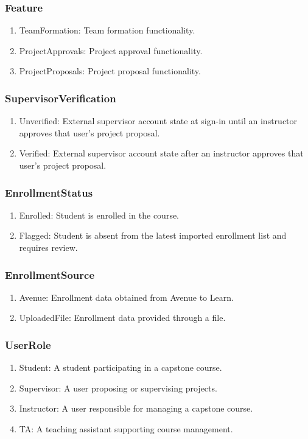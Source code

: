 \documentclass[12pt, titlepage]{article}
\begin{document}
\subsubsection{Feature}
\begin{enumerate}
    \item TeamFormation: Team formation functionality.
    \item ProjectApprovals: Project approval functionality.
    \item ProjectProposals: Project proposal functionality.
\end{enumerate}

\subsubsection{SupervisorVerification}
\begin{enumerate}
    \item Unverified: External supervisor account state at sign-in until an instructor approves that user's project proposal.
    \item Verified: External supervisor account state after an instructor approves that user's project proposal.
\end{enumerate}


\subsubsection{EnrollmentStatus}
\begin{enumerate}
    \item Enrolled: Student is enrolled in the course.
    \item Flagged: Student is absent from the latest imported enrollment list and requires review.
\end{enumerate}

\subsubsection{EnrollmentSource}
\begin{enumerate}
    \item Avenue: Enrollment data obtained from Avenue to Learn.
    \item UploadedFile: Enrollment data provided through a file.
\end{enumerate}

\subsubsection{UserRole}
\begin{enumerate}
    \item Student: A student participating in a capstone course.
    \item Supervisor: A user proposing or supervising projects.
    \item Instructor: A user responsible for managing a capstone course.
    \item TA: A teaching assistant supporting course management.
\end{enumerate}
\end{document}
